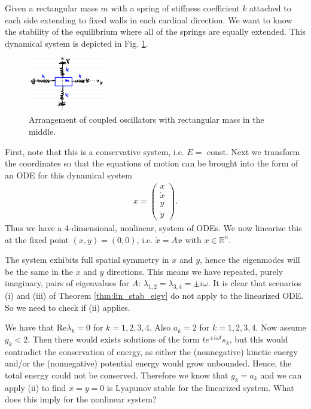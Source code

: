 \begin{ex}
	Given a rectangular mass $m$ with a spring of stiffness coefficient $k$ attached to each side extending to fixed walls in each cardinal direction. We want to know the stability of the equilibrium where all of the springs are equally extended. This dynamical system is depicted in Fig. \ref{fig:quad_spring}.
\begin{figure}[h!]
	\centering
	\includegraphics[width= 0.3\textwidth]{figures/ch2/11quad_spring.png}
\caption{Arrangement of coupled oscillators with rectangular mass in the middle.} \label{fig:quad_spring}
\end{figure}
First, note that this is a conservative system, i.e. $E=$ const. Next we transform the coordinates so that the equations of motion can be brought into the form of an ODE for this dynamical system
\begin{align}
	{x} = 
	\begin{pmatrix}
		x \\ \dot{x} \\ y  \\ \dot{y}
	\end{pmatrix}.
\end{align}
Thus we have a 4-dimensional, nonlinear, system of ODEs. We now linearize this at the fixed point $(x,y)= (0,0)$, i.e. $\dot{{x}} = {A} {x} $ with ${x} \in \mathbb{R}^{n}$.

The system exhibits full spatial symmetry in $x$ and $y$, hence the eigenmodes will be the same in the $x$ and $y$ directions. This means we have repeated, purely imaginary, pairs of eigenvalues for ${A} $:  $\lambda_{1,2}=\lambda_{3,4}= \pm i \omega $. It is clear that scenarios (i) and (iii) of Theorem \ref{thm:lin_stab_eigv} do not apply to the linearized ODE. So we need to check if (ii) applies.

We have that $ \textrm{Re} \lambda _{k}=0$ for $k=1,2,3,4$. Also $a_k=2$ for $k=1,2,3,4$. Now assume $g_k < 2$. Then there would exists solutions of the form $te^{\pm i \omega t}{s}_k$, but this would contradict the conservation of energy, as either the (nonnegative) kinetic energy and/or the (nonnegative) potential energy would grow unbounded. Hence, the total energy could not be conserved. Therefore we know that $g_k = a_k$ and we can apply (ii) to find $x=y=0$ is Lyapunov stable for the linearized system. What does this imply for the nonlinear system?
\end{ex}

